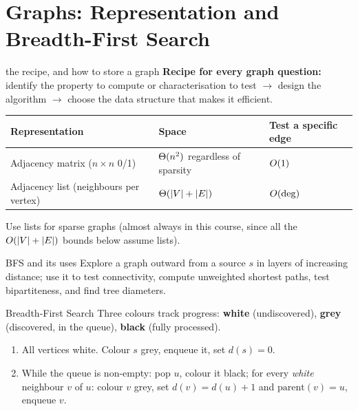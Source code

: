 \section{Graphs: Representation and Breadth-First Search}

\begin{facts}{the recipe, and how to store a graph}
\textbf{Recipe for every graph question:} identify the property to compute or characterisation
to test $\to$ design the algorithm $\to$ choose the data structure that makes it efficient.
\begin{center}
\begin{tabular}{@{}lll@{}}
\toprule
Representation & Space & Test a specific edge \\
\midrule
Adjacency matrix ($n\times n$ 0/1) & $\Theta(n^2)$ regardless of sparsity & $O(1)$ \\
Adjacency list (neighbours per vertex) & $\Theta(|V|+|E|)$ & $O(\deg)$ \\
\bottomrule
\end{tabular}
\end{center}
Use lists for sparse graphs (almost always in this course, since all the $O(|V|+|E|)$ bounds
below assume lists).
\end{facts}

\begin{prob}{BFS and its uses}
Explore a graph outward from a source $s$ in layers of increasing distance; use it to test
connectivity, compute unweighted shortest paths, test bipartiteness, and find tree diameters.
\end{prob}

\begin{algo}{Breadth-First Search}
Three colours track progress: \textbf{white} (undiscovered), \textbf{grey} (discovered, in the
queue), \textbf{black} (fully processed).
\begin{enumerate}
  \item All vertices white. Colour $s$ grey, enqueue it, set $d(s)=0$.
  \item While the queue is non-empty: pop $u$, colour it black; for every \emph{white} neighbour
        $v$ of $u$: colour $v$ grey, set $d(v)=d(u)+1$ and $\mathrm{parent}(v)=u$, enqueue $v$.
\end{enumerate}
\end{algo}

